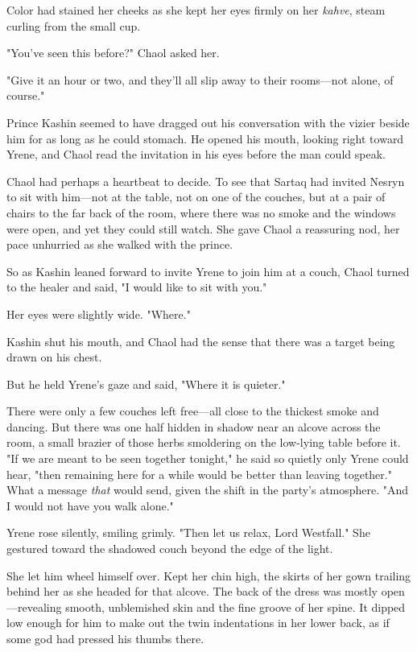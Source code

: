 Color had stained her cheeks as she kept her eyes firmly on her
\emph{kahve}, steam curling from the small cup.

"You've seen this before?" Chaol asked her.

"Give it an hour or two, and they'll all slip away to their rooms---not alone, of course."

Prince Kashin seemed to have dragged out his conversation with the vizier beside him for as long as he could stomach. He opened his mouth, looking right toward Yrene, and Chaol read the invitation in his eyes before the man could speak.

Chaol had perhaps a heartbeat to decide. To see that Sartaq had invited Nesryn to sit with him---not at the table, not on one of the couches, but at a pair of chairs to the far back of the room, where there was no smoke and the windows were open, and yet they could still watch. She gave Chaol a reassuring nod, her pace unhurried as she walked with the prince.

So as Kashin leaned forward to invite Yrene to join him at a couch, Chaol turned to the healer and said, "I would like to sit with you."

Her eyes were slightly wide. "Where."

Kashin shut his mouth, and Chaol had the sense that there was a target being drawn on his chest.

But he held Yrene's gaze and said, "Where it is quieter."

There were only a few couches left free---all close to the thickest smoke and dancing. But there was one half hidden in shadow near an alcove across the room, a small brazier of those herbs smoldering on the low-lying table before it. "If we are meant to be seen together tonight," he said so quietly only Yrene could hear, "then remaining here for a while would be better than leaving together." What a message
\emph{that} would send, given the shift in the party's atmosphere. "And I would not have you walk alone."

Yrene rose silently, smiling grimly. "Then let us relax, Lord Westfall." She gestured toward the shadowed couch beyond the edge of the light.

She let him wheel himself over. Kept her chin high, the skirts of her gown trailing behind her as she headed for that alcove. The back of the dress was mostly open---revealing smooth, unblemished skin and the fine groove of her spine. It dipped low enough for him to make out the twin indentations in her lower back, as if some god had pressed his thumbs there.

